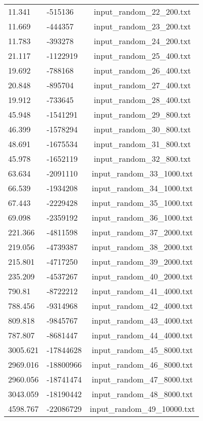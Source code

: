 \begin{longtable}[hb]{|l|l|c|}
    11.341 & -515136 & input\_random\_22\_200.txt \\
    11.669 & -444357 & input\_random\_23\_200.txt \\
    11.783 & -393278 & input\_random\_24\_200.txt \\
    21.117 & -1122919 & input\_random\_25\_400.txt \\
    19.692 & -788168 & input\_random\_26\_400.txt \\
    20.848 & -895704 & input\_random\_27\_400.txt \\
    19.912 & -733645 & input\_random\_28\_400.txt \\
    45.948 & -1541291 & input\_random\_29\_800.txt \\
    46.399 & -1578294 & input\_random\_30\_800.txt \\
    48.691 & -1675534 & input\_random\_31\_800.txt \\
    45.978 & -1652119 & input\_random\_32\_800.txt \\
    63.634 & -2091110 & input\_random\_33\_1000.txt \\
    66.539 & -1934208 & input\_random\_34\_1000.txt \\
    67.443 & -2229428 & input\_random\_35\_1000.txt \\
    69.098 & -2359192 & input\_random\_36\_1000.txt \\
    221.366 & -4811598 & input\_random\_37\_2000.txt \\
    219.056 & -4739387 & input\_random\_38\_2000.txt \\
    215.801 & -4717250 & input\_random\_39\_2000.txt \\
    235.209 & -4537267 & input\_random\_40\_2000.txt \\
    790.81 & -8722212 & input\_random\_41\_4000.txt \\
    788.456 & -9314968 & input\_random\_42\_4000.txt \\
    809.818 & -9845767 & input\_random\_43\_4000.txt \\
    787.807 & -8681447 & input\_random\_44\_4000.txt \\
    3005.621 & -17844628 & input\_random\_45\_8000.txt \\
    2969.016 & -18800966 & input\_random\_46\_8000.txt \\
    2960.056 & -18741474 & input\_random\_47\_8000.txt \\
    3043.059 & -18190442 & input\_random\_48\_8000.txt \\
    4598.767 & -22086729 & input\_random\_49\_10000.txt \\

\end{longtable}
